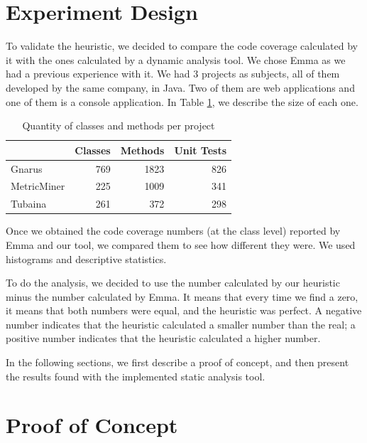 \documentclass{sig-alternate}
\begin{document}
\section{Experiment Design}
\label{sec-experiment}

To validate the heuristic, we decided to compare the code coverage calculated by it with the ones 
calculated by a dynamic analysis tool. We chose Emma as we had a previous experience with it. We
had 3 projects as subjects, all of them developed by the same company, in Java. Two of them are
web applications and one of them is a console application. In Table \ref{tab:projects}, we describe
the size of each one.

\begin{table}[h!]
\centering
\caption{Quantity of classes and methods per project}
\begin{tabular}{ | l | r | r | r | }
\hline
& Classes & Methods & Unit Tests\\ 
\hline
Gnarus & 769 & 1823 & 826\\ 
MetricMiner & 225 & 1009 & 341\\ 
Tubaina & 261 & 372 & 298\\ 

\hline
\end{tabular}
\label{tab:projects}
\end{table}

Once we obtained the code coverage numbers (at the class level) reported by Emma and our tool, 
we compared them to see how different they were. We used histograms and descriptive statistics. 

To do the analysis, we decided to use the number calculated by our heuristic minus the
number calculated by Emma. It means that every time we find a zero, it means that both numbers
were equal, and the heuristic was perfect. A negative number indicates that the heuristic calculated
a smaller number than the real; a positive number indicates that the heuristic calculated a higher
number.

In the following sections, we first describe a proof of concept, and then present the results found
with the implemented static analysis tool.


\section{Proof of Concept}
\label{poc}
\end{document}
